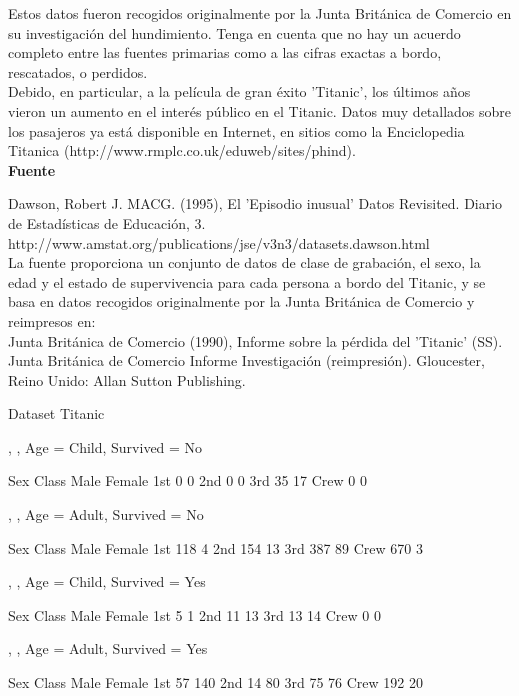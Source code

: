 \documentclass{report}
\begin{document}
\begin{justify}
Estos datos fueron recogidos originalmente por la Junta Británica de Comercio en su investigación del hundimiento. Tenga en cuenta que no hay un acuerdo completo entre las fuentes primarias como a las cifras exactas a bordo, rescatados, o perdidos.\\

Debido, en particular, a la película de gran éxito 'Titanic', los últimos años vieron un aumento en el interés público en el Titanic. Datos muy detallados sobre los pasajeros ya está disponible en Internet, en sitios como la Enciclopedia Titanica (http://www.rmplc.co.uk/eduweb/sites/phind).\\

\textbf{Fuente\\}

Dawson, Robert J. MACG. (1995), El 'Episodio inusual' Datos Revisited. Diario de Estadísticas de Educación, 3. http://www.amstat.org/publications/jse/v3n3/datasets.dawson.html\\

La fuente proporciona un conjunto de datos de clase de grabación, el sexo, la edad y el estado de supervivencia para cada persona a bordo del Titanic, y se basa en datos recogidos originalmente por la Junta Británica de Comercio y reimpresos en:\\

Junta Británica de Comercio (1990), Informe sobre la pérdida del 'Titanic' (SS). Junta Británica de Comercio Informe Investigación (reimpresión). Gloucester, Reino Unido: Allan Sutton Publishing.\\

\end{justify}
\newpage


\begin{center} Dataset Titanic \end{center}

\begin{Schunk}
\begin{Soutput}
, , Age = Child, Survived = No

      Sex
Class  Male Female
  1st     0      0
  2nd     0      0
  3rd    35     17
  Crew    0      0

, , Age = Adult, Survived = No

      Sex
Class  Male Female
  1st   118      4
  2nd   154     13
  3rd   387     89
  Crew  670      3

, , Age = Child, Survived = Yes

      Sex
Class  Male Female
  1st     5      1
  2nd    11     13
  3rd    13     14
  Crew    0      0

, , Age = Adult, Survived = Yes

      Sex
Class  Male Female
  1st    57    140
  2nd    14     80
  3rd    75     76
  Crew  192     20
\end{Soutput}
\end{Schunk}
\end{document}
